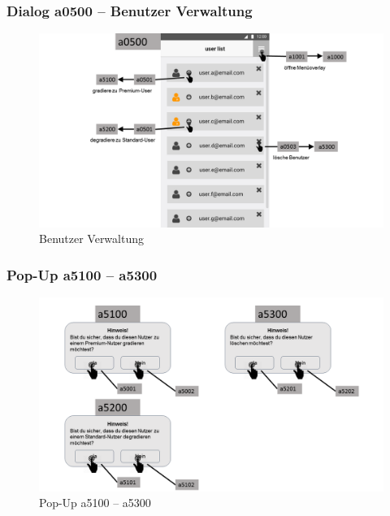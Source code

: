 \documentclass[a4paper,12pt,oneside]{scrartcl}
\begin{document}
\subsubsection{Dialog a0500 – Benutzer Verwaltung}
\begin{figure}[!htbp]
\centering
\noindent\includegraphics[width=\linewidth,height=\textheight,keepaspectratio]{Dialoge/a0500}
\caption{Benutzer Verwaltung}
\end{figure}
\FloatBarrier

\subsubsection{Pop-Up a5100 – a5300}
\begin{figure}[!htbp]
\centering
\noindent\includegraphics[width=\linewidth,height=\textheight,keepaspectratio]{Dialoge/a0500p}
\caption{Pop-Up a5100 – a5300}
\end{figure}
\FloatBarrier
\end{document}
